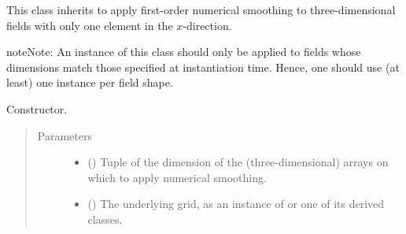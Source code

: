 \documentclass[letterpaper,10pt,english]{sphinxmanual}
\begin{document}

\begin{fulllineitems}
\label{\detokenize{api:dycore.horizontal_smoothing.HorizontalSmoothingFirstOrderYZ}}
This class inherits {\hyperref[\detokenize{api:dycore.horizontal_smoothing.HorizontalSmoothing}]{}} to apply first-order numerical smoothing to
three-dimensional fields with only one element in the \(x\)-direction.

\begin{sphinxadmonition}{note}{Note:}
An instance of this class should only be applied to fields whose dimensions match those specified at instantiation time.
Hence, one should use (at least) one instance per field shape.
\end{sphinxadmonition}

\begin{fulllineitems}
\label{\detokenize{api:dycore.horizontal_smoothing.HorizontalSmoothingFirstOrderYZ.__init__}}
Constructor.
\begin{quote}\begin{description}
\item[{Parameters}] \leavevmode\begin{itemize}
\item {} 
 () \textendash{} Tuple of the dimension of the (three-dimensional) arrays on which to apply numerical smoothing.

\item {} 
 () \textendash{} The underlying grid, as an instance of {\hyperref[\detokenize{api:grids.grid_xyz.GridXYZ}]{}} or one of its derived classes.


\end{itemize}
\end{description}
\end{quote}
\end{fulllineitems}
\end{fulllineitems}
\end{document}
